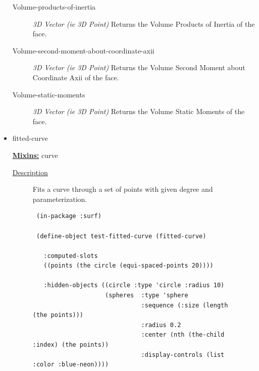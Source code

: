 \documentclass [11pt]{book}
\begin{document}
\begin{itemize}
\begin{description}
\item [Volume-products-of-inertia]
\emph{3D Vector (ie 3D Point)} Returns the Volume Products of Inertia of the face.


\item [Volume-second-moment-about-coordinate-axii]
\emph{3D Vector (ie 3D Point)} Returns the Volume Second Moment about Coordinate Axii of the face.


\item [Volume-static-moments]
\emph{3D Vector (ie 3D Point)} Returns the Volume Static Moments of the face.


\end{description}







\item {}fitted-curve


\textbf{
\underline{Mixins:}} curve





\begin{description}

\item [
\underline{Description}]


Fits a curve through a set of points with given degree 
and parameterization.



\end{description}




\begin{figure}
\begin{lrbox}{\boxedverb}
\begin{minipage}{\linewidth}
{\small

\begin{verbatim}
 (in-package :surf)

 (define-object test-fitted-curve (fitted-curve) 
  
   :computed-slots
   ((points (the circle (equi-spaced-points 20))))

   :hidden-objects ((circle :type 'circle :radius 10)
                    (spheres  :type 'sphere
                              :sequence (:size (length (the points)))
                              :radius 0.2
                              :center (nth (the-child :index) (the points))
                              :display-controls (list :color :blue-neon))))



\end{verbatim}}
\end{minipage}
\end{lrbox}
\end{figure}
\end{itemize}
\end{document}
